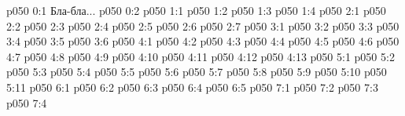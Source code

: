\author{Вторичный Ланонандек}
\vs p050 0:1  Бла-бла...
\vs p050 0:2 
\vs p050 1:1 
\vs p050 1:2 
\vs p050 1:3 
\vs p050 1:4 
\vs p050 2:1 
\vs p050 2:2 
\vs p050 2:3 
\vs p050 2:4 
\vs p050 2:5 
\vs p050 2:6 
\vs p050 2:7 
\vs p050 3:1 
\vs p050 3:2 \pc 
\vs p050 3:3 
\vs p050 3:4 \pc 
\vs p050 3:5 
\vs p050 3:6 
\vs p050 4:1 
\vs p050 4:2 
\vs p050 4:3 \pc 
\vs p050 4:4 
\vs p050 4:5 
\vs p050 4:6 
\vs p050 4:7 
\vs p050 4:8 
\vs p050 4:9 \pc 
\vs p050 4:10 
\vs p050 4:11 \pc 
\vs p050 4:12 
\vs p050 4:13 
\vs p050 5:1 
\vs p050 5:2 
\vs p050 5:3 
\vs p050 5:4 
\vs p050 5:5 
\vs p050 5:6 
\vs p050 5:7 
\vs p050 5:8 
\vs p050 5:9 
\vs p050 5:10 
\vs p050 5:11 \pc 
{}
\vs p050 6:1 
\vs p050 6:2 
\vs p050 6:3 
\vs p050 6:4 
\vs p050 6:5 \pc 
{}
\vs p050 7:1 
\vs p050 7:2 
\vs p050 7:3 
\vsetoff
\vs p050 7:4 
\quizlink
